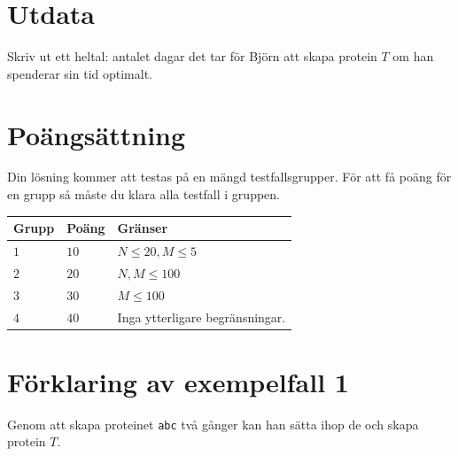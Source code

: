 \section*{Utdata}
Skriv ut ett heltal: antalet dagar det tar för Björn att skapa protein $T$ om han spenderar sin tid optimalt.


\section*{Poängsättning}
Din lösning kommer att testas på en mängd testfallsgrupper.
För att få poäng för en grupp så måste du klara alla testfall i gruppen.

\noindent
\begin{tabular}{| l | l | p{12cm} |}
  \hline
  \textbf{Grupp} & \textbf{Poäng} & \textbf{Gränser} \\ \hline
  $1$    & $10$       & $N \leq 20, M \leq 5$ \\ \hline
  $2$    & $20$       & $N, M \leq 100$ \\ \hline
  $3$    & $30$       & $M \leq 100$ \\ \hline
  $4$    & $40$       & Inga ytterligare begränsningar. \\ \hline
\end{tabular}

\section*{Förklaring av exempelfall 1}
Genom att skapa proteinet \texttt{abc} två gånger kan han sätta ihop de och skapa protein $T$.
